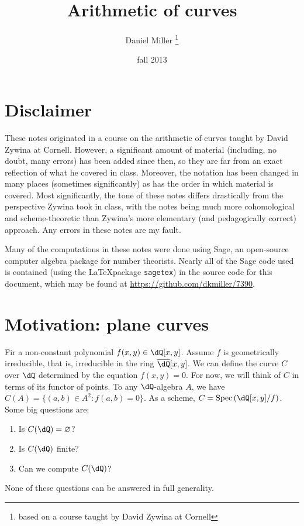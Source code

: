 \documentclass{article}
\title{Arithmetic of curves}
\author{Daniel Miller
  \thanks{based on a course taught by David Zywina at Cornell}}
\date{fall 2013}
\begin{document}
\maketitle
\tableofcontents





\newpage
\section*{Disclaimer}

These notes originated in a course on the arithmetic of curves taught by David 
Zywina at Cornell. However, a significant amount of material (including, no 
doubt, many errors) has been added since then, so they are far from an exact 
reflection of what he covered in class. Moreover, the notation has been changed 
in many places (sometimes significantly) as has the order in which material is 
covered. Most significantly, the tone of these notes differs drastically 
from the perspective Zywina took in class, with the notes being much more 
cohomological and scheme-theoretic than Zywina's more elementary (and 
pedagogically correct) approach. Any errors in these notes are my fault. 

Many of the computations in these notes were done using Sage, an open-source 
computer algebra package for number theorists. Nearly all of the Sage code 
used is contained (using the \LaTeX package \texttt{sagetex}) in the source 
code for this document, which may be found at 
\url{https://github.com/dkmiller/7390}. 










\section*{Motivation: plane curves}





Fir a non-constant polynomial $f(x,y)\in\dQ[x,y]$. Assume $f$ is 
geometrically irreducible, that is, irreducible in the ring 
$\overline{\dQ}[x,y]$. We can define the curve $C$ over $\dQ$ determined by the 
equation $f(x,y)=0$. For now, we will think of $C$ in terms of its functor of 
points. To any $\dQ$-algebra $A$, we have $C(A)=\{(a,b)\in A^2:f(a,b)=0\}$. 
As a scheme, $C=\spec\left(\dQ[x,y]/f\right)$. Some big questions are:
\begin{enumerate}
  \item Is $C(\dQ)=\varnothing$?
  \item Is $C(\dQ)$ finite?
  \item Can we compute $C(\dQ)$?
\end{enumerate}
None of these questions can be answered in full generality. 
\end{document}
